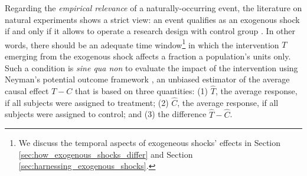 \begin{refsection}
Regarding the \textit{empirical relevance} of a naturally-occurring event, the
literature on natural experiments shows a strict view: an event qualifies as an
exogenous shock if and only if it allows to operate a research design with
control group \parencite[][]{cook_et_al_2002}. In other words, there should be
an adequate time window\footnote{We discuss the temporal aspects of exogeneous
shocks' effects in Section \ref{sec:how_exogenous_shocks_differ} and Section
\ref{sec:harnessing_exogenous_shocks}.} in which the intervention $T$ emerging
from the exogenous shock affects a fraction a population's units only.  Such a
condition is \textit{sine qua non} to evaluate the impact of the intervention
using Neyman's potential outcome framework \parencite*{neyman_et_al_1923}, an
unbiased estimator of the average causal effect $T - C$ that is based on three
quantities: (1) $\widehat{T}$, the average response, if all subjects were assigned
to treatment; (2) $\widehat{C}$, the average response, if all subjects were assigned
to control; and (3) the difference $\hat{T} - \widehat{C}$.


\end{refsection}
